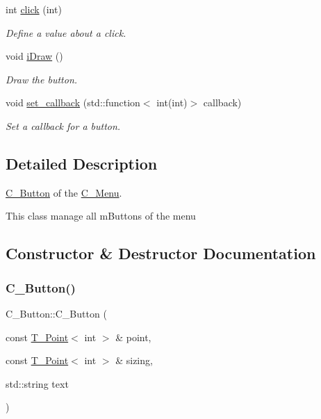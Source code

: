 \begin{DoxyCompactItemize}
int \hyperlink{classButton_af6a02022f77e1809a90cb6159c1a1536}{click} (int)
\begin{DoxyCompactList}\small\item\em Define a value about a click. \end{DoxyCompactList}\item 
\mbox{\label{classButton_a0380207dc9e4edcd0272207a39c7cdeb}} 
void \hyperlink{classButton_a0380207dc9e4edcd0272207a39c7cdeb}{iDraw} ()
\begin{DoxyCompactList}\small\item\em Draw the button. \end{DoxyCompactList}\item 
void \hyperlink{classButton_aff79964a98ce6c76d0ece8502a830985}{set\+\_\+callback} (std\+::function$<$ int(int)$>$ callback)
\begin{DoxyCompactList}\small\item\em Set a callback for a button. \end{DoxyCompactList}\end{DoxyCompactItemize}


\subsection{Detailed Description}
\hyperlink{classButton}{C_Button} of the \hyperlink{classMenu}{C_Menu}.

This class manage all mButtons of the menu

\subsection{Constructor \& Destructor Documentation}
\mbox{\label{classButton_aaa8e2182b5ddda43df9a959815ea08bc}} 
\subsubsection{\texorpdfstring{C_Button()}{C_Button()}\hspace{0.1cm}{\footnotesize\ttfamily [1/2]}}
{\footnotesize\ttfamily C_Button\+::\+C_Button (\begin{DoxyParamCaption}\item[{const \hyperlink{classPoint}{T_Point}$<$ int $>$ \&}]{point,  }\item[{const \hyperlink{classPoint}{T_Point}$<$ int $>$ \&}]{sizing,  }\item[{std\+::string}]{text }\end{DoxyParamCaption})}



